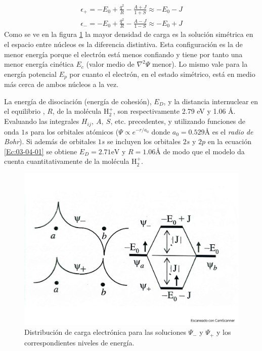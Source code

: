 \begin{align}
\epsilon_+ = - E_0 + \frac{q^2}{R} - \frac{A+J}{1+S} \approx - E_0 -J \\
\epsilon_- = - E_0 + \frac{q^2}{R} - \frac{A-J}{1-S} \approx - E_0 +J
\end{align}
Como se ve en la figura \ref{Fig:03-05} la mayor densidad de carga es la solución simétrica en el espacio entre núcleos es la diferencia distintiva. Esta configuración es la de menor energía porque el electrón está menos confiando y tiene por tanto una menor energía cinética $E_c$ (valor medio de $\nabla^2 \Psi$ menor). Lo mismo vale para la energía potencial $E_p$ por cuanto el electrón, en el estado simétrico, está en medio más cerca de ambos núcleos a la vez.


La energía de disociación (energía de cohesión), $E_D$, y la distancia internuclear en el equilibrio , $R$, de la molécula H$_2^+$, son respectivamente 2.79 eV y 1.06  \unit{\angstrom}. Evaluando las integrales $H_{ij}, \ A, \ S$, etc. precedentes, y utilizando funciones de onda $1s$ para los orbitales atómicos ($\Psi \propto e^{-r/a_0}$ donde $a_0=0.529\unit{\angstrom}$ es el \textit{radio de Bohr}). Si además de orbitales $1s$ se incluyen los orbitales $2s$ y $2p$ en la ecuación \ref{Ec:03-04-01} se obtiene $E_D = 2.71 \unit{\eV} $ y $R=1.06 \unit{\angstrom}$ de modo que el modelo da cuenta cuantitativamente de la molécula H$_2^+$.


\begin{figure}[h!] \centering
    \includegraphics[scale=0.5]{Cuerpo/Ch_03/Fotos libro 4.pdf}
    \caption{Distribución de carga electrónica para las soluciones $\Psi_-$ y $\Psi_+$ y los correspondientes niveles de energía.}
    \label{Fig:03-05}
\end{figure}    



